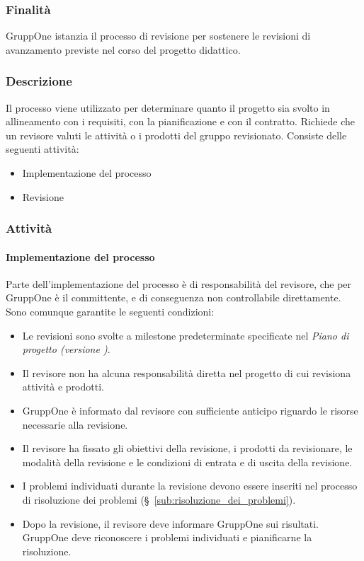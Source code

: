 \documentclass[../../norme-di-progetto.tex]{subfiles}
\begin{document}
\subsubsection{Finalità}%
\label{subs:revisione/finalita}

GruppOne istanzia il processo di revisione per sostenere le revisioni di avanzamento previste nel corso del progetto didattico.

\subsubsection{Descrizione}%
\label{subs:revisione/descrizione}

Il processo viene utilizzato per determinare quanto il progetto sia svolto in allineamento con i requisiti, con la pianificazione e con il contratto.
Richiede che un revisore valuti le attività o i prodotti del gruppo revisionato.
Consiste delle seguenti attività:

\begin{itemize}
  \item Implementazione del processo
  \item Revisione
\end{itemize}

\subsubsection{Attività}%
\label{subs:revisione/attivita}

\paragraph{Implementazione del processo}%
\label{par:revisione/implementazione_del_processo}

Parte dell'implementazione del processo è di responsabilità del revisore, che per GruppOne è il committente, e di conseguenza non controllabile direttamente.
Sono comunque garantite le seguenti condizioni:

\begin{itemize}
  \item Le revisioni sono svolte a milestone predeterminate specificate nel \textit{Piano di progetto (versione \versione)}.
  \item Il revisore non ha alcuna responsabilità diretta nel progetto di cui revisiona attività e prodotti.
  \item GruppOne è informato dal revisore con sufficiente anticipo riguardo le risorse necessarie alla revisione.
  \item Il revisore ha fissato gli obiettivi della revisione, i prodotti da revisionare, le modalità della revisione e le condizioni di entrata e di uscita della revisione.
  \item I problemi individuati durante la revisione devono essere inseriti nel processo di risoluzione dei problemi (§~\ref{sub:risoluzione_dei_problemi}).
  \item Dopo la revisione, il revisore deve informare GruppOne sui risultati. GruppOne deve riconoscere i problemi individuati e pianificarne la risoluzione.
\end{itemize}
\end{document}
